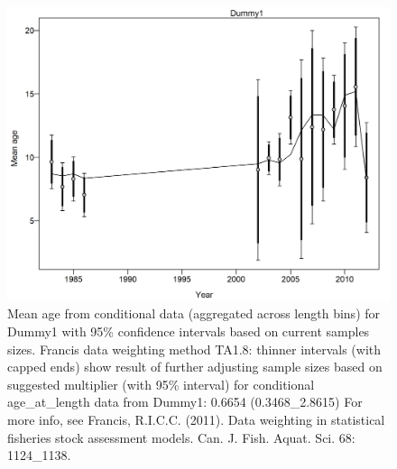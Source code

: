 \documentclass[12pt,]{article}
\begin{document}
\begin{figure}
\centering
\includegraphics{./r4ss/plots_mod1/comp_condAALfit_data_weighting_TA1.8_condAgeDummy1.png}
\caption{Mean age from conditional data (aggregated across length bins)
for Dummy1 with 95\% confidence intervals based on current samples
sizes. Francis data weighting method TA1.8: thinner intervals (with
capped ends) show result of further adjusting sample sizes based on
suggested multiplier (with 95\% interval) for conditional
age\_at\_length data from Dummy1: 0.6654 (0.3468\_2.8615) For more info,
see Francis, R.I.C.C. (2011). Data weighting in statistical fisheries
stock assessment models. Can. J. Fish. Aquat. Sci. 68: 1124\_1138.
\label{fig:mod1_16_comp_condAALfit_data_weighting_TA1.8_condAgeDummy1}}
\end{figure}
\end{document}
